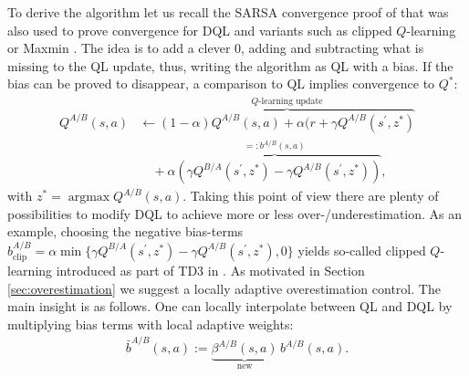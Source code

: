 \documentclass{article}
\theoremstyle{plain}
\theoremstyle{definition}
\theoremstyle{remark}
\begin{document}
To derive the algorithm let us recall the SARSA convergence proof of \cite{singh2000} that was also used to prove convergence for DQL \cite{hasselt2010} and variants such as clipped $Q$-learning \cite{fujimoto2018addressing} or Maxmin \cite{Maxmin}. The idea is to add a clever $0$, adding and subtracting what is missing to the QL update, thus, writing the algorithm as QL with a bias. If the bias can be proved to disappear, a comparison to QL implies convergence to $Q^*$:
 \begin{align*}
 Q^{A/B} (s,a) 
  & \leftarrow \overbrace{(1-\alpha) Q^{A/B}(s,a) + \alpha \big( r + \gamma Q^{A/B}(s^\prime,z^\ast)}^{\text{$Q$-learning update}}\\
  &\quad+  \overbrace{\alpha  ( \gamma Q^{B/A}(s^\prime,z^\ast) - \gamma Q^{A/B}(s^\prime,z^\ast) )}^{=:b^{A/B}(s,a)},
 \end{align*}
 with $z^*=\operatorname{argmax} Q^{A/B}(s,a)$. Taking this point of view there are plenty of possibilities to modify DQL to achieve more or less over-/underestimation. As an example, choosing the negative bias-terms 
$b^{A/B}_{\text{clip}}=\alpha \min\{\gamma Q^{B/A}(s^\prime,z^\ast)- \gamma Q^{A/B}(s^\prime,z^\ast),0\}$ yields so-called clipped $Q$-learning introduced as part of TD3 in \cite{fujimoto2018addressing}. As motivated in Section \ref{sec:overestimation} we suggest a locally adaptive overestimation control. The main insight is as follows. One can locally interpolate between QL and DQL by multiplying bias terms with local adaptive weights:
\begin{align*}   
\bar{b}^{A/B}(s,a):=\underbrace{\beta^{A/B}(s,a)}_{\text{new}}\,b^{A/B}(s,a).
\end{align*}
\end{document}

